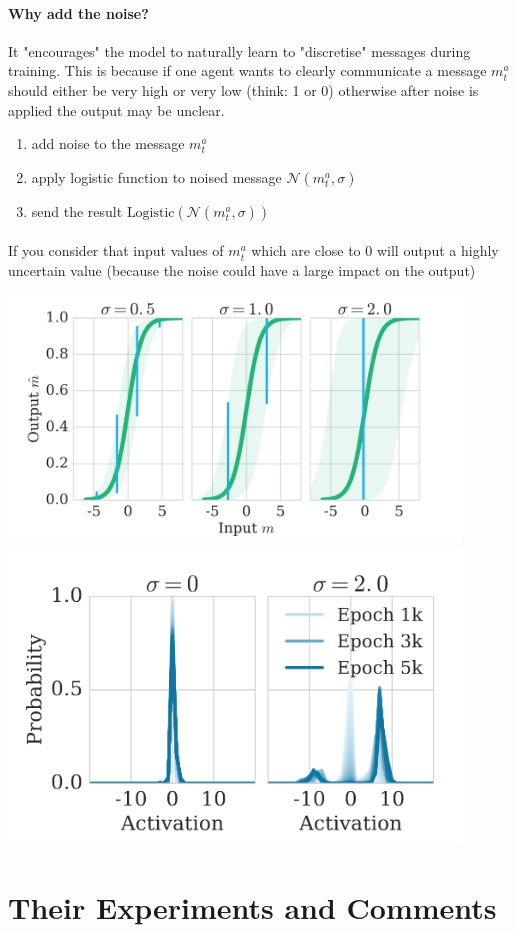 \documentclass{article}
\begin{document}
    \paragraph{Why add the noise?} It "encourages" the model to naturally learn to "discretise" messages during training. This is because if one agent wants to clearly communicate a message $m^a_t$ should either be very high or very low (think: 1 or 0) otherwise after noise is applied the output may be unclear.
    \begin{enumerate}
        \item add noise to the message $m^a_t$ 
        \item apply logistic function to noised message $\mathcal{N}(m^a_t, \sigma)$
        \item send the result $\text{Logistic}(\mathcal{N}(m^a_t, \sigma))$
    \end{enumerate}

    \paragraph{} If you consider that input values of $m^a_t$ which are close to 0 will output a highly uncertain value (because the noise could have a large impact on the output)

    \includegraphics[width=12cm]{fig2.png}
    \includegraphics[width=12cm]{fig3.png}
    \section{Their Experiments and Comments}
\end{document}
